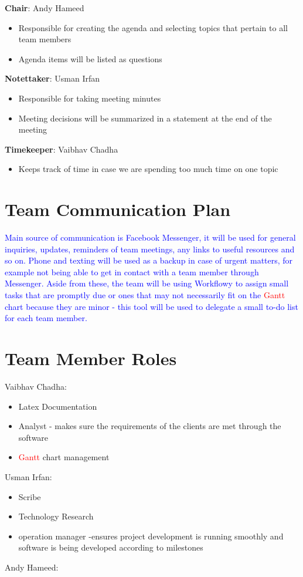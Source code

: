\documentclass{article}
\begin{document}
\textbf{Chair}: Andy Hameed
\begin{itemize}
	\item Responsible for creating the agenda and selecting topics that pertain to all team members
	\item Agenda items will be listed as questions\\
\end{itemize}
\textbf{Notettaker}: Usman Irfan
\begin{itemize}
	\item Responsible for taking meeting minutes
	\item Meeting decisions will be summarized in a statement at the end of the meeting
\end{itemize}
\textbf{Timekeeper}: Vaibhav Chadha
\begin{itemize}
	\item Keeps track of time in case we are spending too much time on one topic
\end{itemize}


\section{Team Communication Plan}
\textcolor{blue}{Main source of communication is Facebook Messenger, it will be used for general inquiries, updates, reminders of team meetings, any links to useful resources and so on. Phone and texting will be used as a backup in case of urgent matters, for example not being able to get in contact with a team member through Messenger.
Aside from these, the team will be using Workflowy to assign small tasks that are promptly due or ones that may not necessarily fit on the \textcolor{red}{Gantt} chart because they are minor - this tool will be used to delegate a small to-do list for each team member.
} 

\section{Team Member Roles}

Vaibhav Chadha:
\begin{itemize}
\item Latex Documentation
\item Analyst - makes sure the requirements of the clients are met through the software
\item \textcolor{red}{Gantt} chart management\\
\end{itemize}
Usman Irfan: 
\begin{itemize}
\item Scribe
\item Technology Research
\item operation manager -ensures project development is running smoothly and software is being developed according to milestones \\
\end{itemize}
Andy Hameed:
\end{document}
